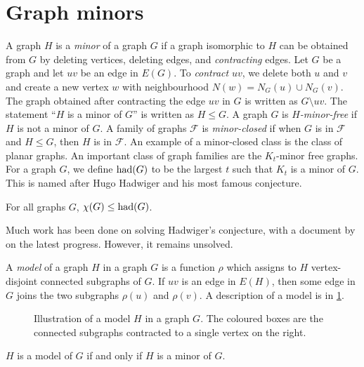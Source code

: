 \section{Graph minors}\label{sec:Graph Minors}
A graph \(H\) is a \textit{minor} of a graph \(G\) if a graph isomorphic to \(H\) can be obtained from \(G\) by deleting vertices, deleting edges, and \textit{contracting} edges. Let $G$ be a graph and let $uv$ be an edge in $E(G)$. To \textit{contract} \(uv\), we delete both \(u\) and \(v\) and create a new vertex \(w\) with neighbourhood \(N(w) = N_G(u) \cup N_G(v)\). The graph obtained after contracting the edge \(uv\) in $G$ is written as \(G\setminus uv\).
The statement ``\(H\) is a minor of \(G\)'' is written as \(H \leq G\). A graph \(G\) is \textit{\(H\)-minor-free} if $H$ is not a minor of $G$. A family of graphs \(\mathcal{F}\) is \textit{minor-closed} if when $G$ is in \(\mathcal{F}\) and \(H \leq G\), then $H$ is in \(\mathcal{F}\).
An example of a minor-closed class is the class of planar graphs.
An important class of graph families are the \(K_t\)-minor free graphs. For a graph \(G\), we define \(\operatorname{had}(G)\) to be the largest \(t\) such that \(K_t\) is a minor of \(G\). This is named after Hugo Hadwiger and his most famous conjecture.

\begin{conjecture}
	For all graphs \(G\), \(\chi(G) \leq \operatorname{had}(G)\)\cite{hadwigerUeberKlassifikationStreckenkomplexe1943}.
\end{conjecture}
Much work has been done on solving Hadwiger's conjecture, with a document by \textcite{seymourHadwigerConjecture2016} on the latest progress. However, it remains unsolved. 

A \textit{model} of a graph \(H\) in a graph \(G\) is a function $\rho$ which assigns to \(H\) vertex-disjoint connected subgraphs of \(G\). If $uv$ is an edge in \(E(H)\), then some edge in \(G\) joins the two subgraphs \(\rho(u)\) and \(\rho(v)\). A description of a model is in \cref{fig:model_of_P5}.
\begin{figure}[h!]\label{fig:model_of_P5}
	\centering
	
	\caption{Illustration of a model $H$ in a graph $G$. The coloured boxes are the connected subgraphs contracted to a single vertex on the right.}
\end{figure}

\begin{theorem}
	\(H\) is a model of \(G\) if and only if $H$ is a minor of $G$.
\end{theorem}

